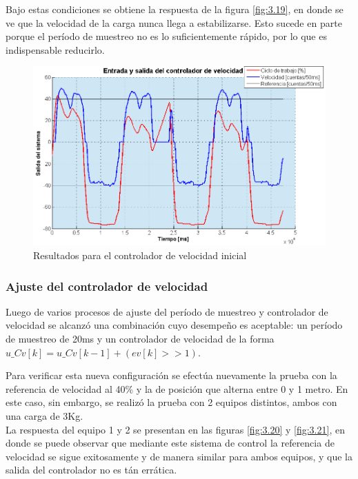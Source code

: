 Bajo estas condiciones se obtiene la respuesta de la figura \ref{fig:3.19}, en donde se ve que la velocidad de la carga nunca llega a estabilizarse. Esto sucede en parte porque el período de muestreo no es lo suficientemente rápido, por lo que es indispensable reducirlo.

\begin{figure}[!ht]
	\centering
	\includegraphics[width=16cm,scale=1]{resources/3_19-esquemaControl1.png}
	\caption{Resultados para el controlador de velocidad inicial}
	\label{fig:\thefigure}
\end{figure}

\subsubsection{Ajuste del controlador de velocidad}
Luego de varios procesos de ajuste del período de muestreo y controlador de velocidad se alcanzó una combinación cuyo desempeño es aceptable: un período de muestreo de 20ms y un controlador de velocidad de la forma \(u\_Cv[k] = u\_Cv[k-1] + (ev[k] >> 1)\).

Para verificar esta nueva configuración se efectúa nuevamente la prueba con la referencia de velocidad al 40\% y la de posición que alterna entre 0 y 1 metro. En este caso, sin embargo, se realizó la prueba con 2 equipos distintos, ambos con una carga de 3Kg.\\
La respuesta del equipo 1 y 2 se presentan en las figuras \ref{fig:3.20} y \ref{fig:3.21}, en donde se puede observar que mediante este sistema de control la referencia de velocidad se sigue exitosamente y de manera similar para ambos equipos, y que la salida del controlador no es tán errática.

